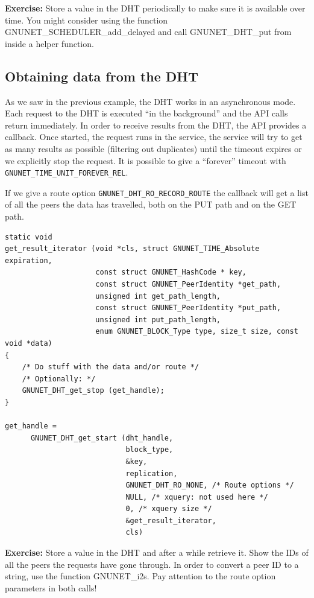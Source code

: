 \documentclass[10pt]{article}
\newcommand{\exercise}[1]{\noindent\begin{boxedminipage}{\textwidth}{\bf Exercise:} #1 \end{boxedminipage}}
\begin{document}
\exercise{Store a value in the DHT periodically to make sure it is available
over time. You might consider using the function GNUNET\_SCHEDULER\_add\_delayed and
call GNUNET\_DHT\_put from inside a helper function.}


\subsection{Obtaining data from the DHT}
As we saw in the previous example, the DHT works in an asynchronous mode.
Each request to the DHT is executed ``in the background'' and the API
calls return immediately. In order to receive results from the DHT, the
API provides a callback. Once started, the request runs in the service,
the service will try to get as many results as possible (filtering out
duplicates) until the timeout expires or we explicitly stop the request.
It is possible to give a ``forever'' timeout with
{\tt GNUNET\_TIME\_UNIT\_FOREVER\_REL}.

If we give a route option {\tt GNUNET\_DHT\_RO\_RECORD\_ROUTE} the callback
will get a list of all the peers the data has travelled, both on the PUT
path and on the GET path.
\lstset{language=C}
\begin{lstlisting}
static void
get_result_iterator (void *cls, struct GNUNET_TIME_Absolute expiration,
                     const struct GNUNET_HashCode * key,
                     const struct GNUNET_PeerIdentity *get_path,
                     unsigned int get_path_length,
                     const struct GNUNET_PeerIdentity *put_path,
                     unsigned int put_path_length,
                     enum GNUNET_BLOCK_Type type, size_t size, const void *data)
{
    /* Do stuff with the data and/or route */
    /* Optionally: */
    GNUNET_DHT_get_stop (get_handle);
}

get_handle =
      GNUNET_DHT_get_start (dht_handle,
                            block_type,
                            &key,
                            replication,
                            GNUNET_DHT_RO_NONE, /* Route options */
                            NULL, /* xquery: not used here */
                            0, /* xquery size */
                            &get_result_iterator,
                            cls)
\end{lstlisting}

\exercise{Store a value in the DHT and after a while retrieve it. Show the IDs of all
the peers the requests have gone through. In order to convert a peer ID to a string, use
the function GNUNET\_i2s. Pay attention to the route option parameters in both calls!}
\end{document}

